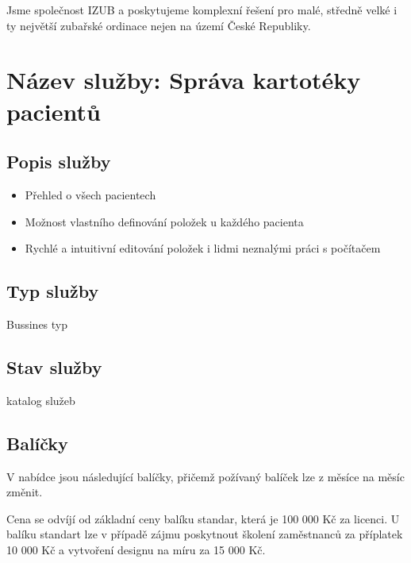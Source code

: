 \documentclass[12pt, a4paper, titlepage]{article}
\begin{document}
	\vspace{1em}

	\noindent Jsme společnost IZUB a poskytujeme komplexní řešení pro malé, středně velké i ty největší zubařské ordinace nejen na území České Republiky.
	\vspace{1em}

	\noindent\makebox[\linewidth]{\rule{16cm}{0.4pt}}

	\vspace{2em}

	\section*{Název služby: Správa kartotéky pacientů}
	\vspace{1em}

	\subsection*{Popis služby}
	\begin{itemize}
		\item Přehled o všech pacientech
		\item Možnost vlastního definování položek u každého pacienta
		\item Rychlé a intuitivní editování položek i lidmi neznalými práci s počítačem
	\end{itemize}

	\subsection*{Typ služby}

	Bussines typ

	\subsection*{Stav služby}

	katalog služeb

	\subsection*{Balíčky}
	V nabídce jsou následující balíčky, přičemž požívaný balíček lze z měsíce na měsíc změnit.

	\vspace{1em}

	\noindent Cena se odvíjí od základní ceny balíku standar, která je 100 000 Kč za licenci. U balíku standart lze v případě zájmu poskytnout školení zaměstnanců za příplatek 10 000 Kč a vytvoření designu na míru za 15 000 Kč.
\end{document}

